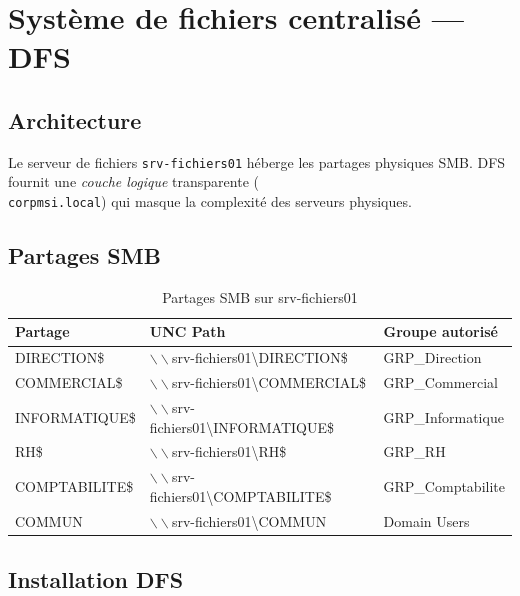 \chapter{Système de fichiers centralisé — DFS}

\section{Architecture}

Le serveur de fichiers \texttt{srv-fichiers01} héberge les partages physiques SMB. DFS fournit une \textit{couche logique} transparente (\texttt{\\corpmsi.local\Partages}) qui masque la complexité des serveurs physiques.

\section{Partages SMB}

\begin{table}[H]
    \centering
    \begin{tabularx}{\textwidth}{|l|l|p{3cm}|}
        \hline
        \textbf{Partage} & \textbf{UNC Path} & \textbf{Groupe autorisé} \\
        \hline
        DIRECTION\$ & $\backslash\backslash$srv-fichiers01\textbackslash DIRECTION\$ & GRP\_Direction \\
        \hline
        COMMERCIAL\$ & $\backslash\backslash$srv-fichiers01\textbackslash COMMERCIAL\$ & GRP\_Commercial \\
        \hline
        INFORMATIQUE\$ & $\backslash\backslash$srv-fichiers01\textbackslash INFORMATIQUE\$ & GRP\_Informatique \\
        \hline
        RH\$ & $\backslash\backslash$srv-fichiers01\textbackslash RH\$ & GRP\_RH \\
        \hline
        COMPTABILITE\$ & $\backslash\backslash$srv-fichiers01\textbackslash COMPTABILITE\$ & GRP\_Comptabilite \\
        \hline
        COMMUN & $\backslash\backslash$srv-fichiers01\textbackslash COMMUN & Domain Users \\
        \hline
    \end{tabularx}
    \caption{Partages SMB sur srv-fichiers01}
    \label{tab:smb-shares}
\end{table}

\section{Installation DFS}

